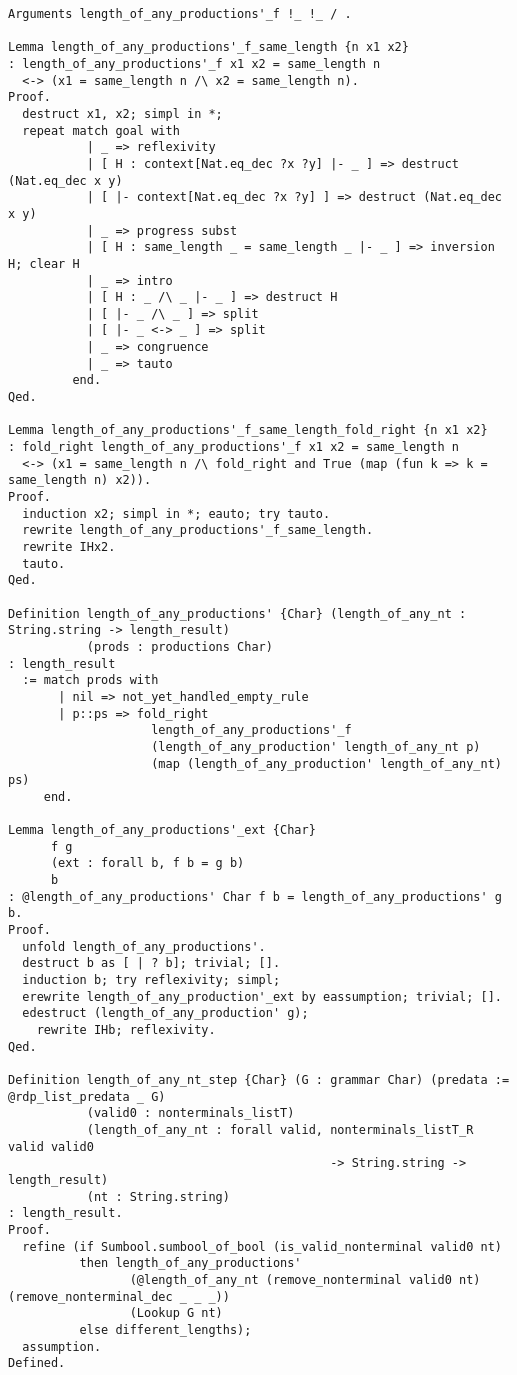 \begin{verbatim}
Arguments length_of_any_productions'_f !_ !_ / .

Lemma length_of_any_productions'_f_same_length {n x1 x2}
: length_of_any_productions'_f x1 x2 = same_length n
  <-> (x1 = same_length n /\ x2 = same_length n).
Proof.
  destruct x1, x2; simpl in *;
  repeat match goal with
           | _ => reflexivity
           | [ H : context[Nat.eq_dec ?x ?y] |- _ ] => destruct (Nat.eq_dec x y)
           | [ |- context[Nat.eq_dec ?x ?y] ] => destruct (Nat.eq_dec x y)
           | _ => progress subst
           | [ H : same_length _ = same_length _ |- _ ] => inversion H; clear H
           | _ => intro
           | [ H : _ /\ _ |- _ ] => destruct H
           | [ |- _ /\ _ ] => split
           | [ |- _ <-> _ ] => split
           | _ => congruence
           | _ => tauto
         end.
Qed.

Lemma length_of_any_productions'_f_same_length_fold_right {n x1 x2}
: fold_right length_of_any_productions'_f x1 x2 = same_length n
  <-> (x1 = same_length n /\ fold_right and True (map (fun k => k = same_length n) x2)).
Proof.
  induction x2; simpl in *; eauto; try tauto.
  rewrite length_of_any_productions'_f_same_length.
  rewrite IHx2.
  tauto.
Qed.

Definition length_of_any_productions' {Char} (length_of_any_nt : String.string -> length_result)
           (prods : productions Char)
: length_result
  := match prods with
       | nil => not_yet_handled_empty_rule
       | p::ps => fold_right
                    length_of_any_productions'_f
                    (length_of_any_production' length_of_any_nt p)
                    (map (length_of_any_production' length_of_any_nt) ps)
     end.

Lemma length_of_any_productions'_ext {Char}
      f g
      (ext : forall b, f b = g b)
      b
: @length_of_any_productions' Char f b = length_of_any_productions' g b.
Proof.
  unfold length_of_any_productions'.
  destruct b as [ | ? b]; trivial; [].
  induction b; try reflexivity; simpl;
  erewrite length_of_any_production'_ext by eassumption; trivial; [].
  edestruct (length_of_any_production' g);
    rewrite IHb; reflexivity.
Qed.

Definition length_of_any_nt_step {Char} (G : grammar Char) (predata := @rdp_list_predata _ G)
           (valid0 : nonterminals_listT)
           (length_of_any_nt : forall valid, nonterminals_listT_R valid valid0
                                             -> String.string -> length_result)
           (nt : String.string)
: length_result.
Proof.
  refine (if Sumbool.sumbool_of_bool (is_valid_nonterminal valid0 nt)
          then length_of_any_productions'
                 (@length_of_any_nt (remove_nonterminal valid0 nt) (remove_nonterminal_dec _ _ _))
                 (Lookup G nt)
          else different_lengths);
  assumption.
Defined.


\end{verbatim}
